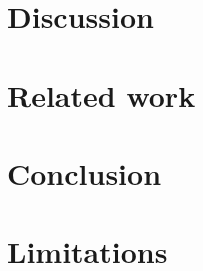 \section{Discussion}


\section{Related work}
\label{sec:related-work}


\section{Conclusion} \label{sec:conclusion}
\section{Limitations} \label{sec:limitations}
